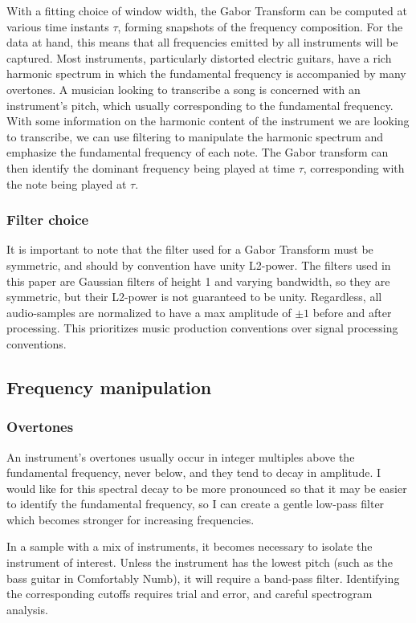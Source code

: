 \documentclass{article}
\begin{document}
With a fitting choice of window width, the Gabor Transform can be computed at various time instants $\tau$, forming snapshots of the frequency composition. For the data at hand, this means that all frequencies emitted by all instruments will be captured. Most instruments, particularly distorted electric guitars, have a rich harmonic spectrum in which the fundamental frequency is accompanied by many overtones. A musician looking to transcribe a song is concerned with an instrument's pitch, which usually corresponding to the fundamental frequency.  With some information on the harmonic content of the instrument we are looking to transcribe, we can use filtering to manipulate the harmonic spectrum and emphasize the fundamental frequency of each note. The Gabor transform can then identify the dominant frequency being played at time $\tau$, corresponding with the note being played at $\tau$.
	
\subsubsection{Filter choice}
	
	It is important to note that the filter used for a Gabor Transform must be symmetric, and should by convention have unity L2-power. The filters used in this paper are Gaussian filters of height 1 and varying bandwidth, so they are symmetric, but their L2-power is not guaranteed to be unity. Regardless, all audio-samples are normalized to have a max amplitude of $\pm1$ before and after processing. This prioritizes music production conventions over signal processing conventions.

\subsection{Frequency manipulation}
\subsubsection{Overtones}
An instrument's overtones usually occur in integer multiples above the fundamental frequency, never below, and they tend to decay in amplitude. I would like for this spectral decay to be more pronounced so that it may be easier to identify the fundamental frequency, so I can create a gentle low-pass filter which becomes stronger for increasing frequencies.

In a sample with a mix of instruments, it becomes necessary to isolate the instrument of interest. Unless the instrument has the lowest pitch (such as the bass guitar in Comfortably Numb), it will require a band-pass filter. Identifying the corresponding cutoffs requires trial and error, and careful spectrogram analysis.
\end{document}
